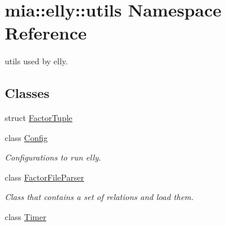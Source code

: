 \hypertarget{namespacemia_1_1elly_1_1utils}{\section{mia\-:\-:elly\-:\-:utils Namespace Reference}
\label{namespacemia_1_1elly_1_1utils}
}


utils used by elly.  


\subsection*{Classes}
\begin{DoxyCompactItemize}
\item 
struct \hyperlink{structmia_1_1elly_1_1utils_1_1_factor_tuple}{Factor\-Tuple}
\item 
class \hyperlink{classmia_1_1elly_1_1utils_1_1_config}{Config}
\begin{DoxyCompactList}\small\item\em Configurations to run elly. \end{DoxyCompactList}\item 
class \hyperlink{classmia_1_1elly_1_1utils_1_1_factor_file_parser}{Factor\-File\-Parser}
\begin{DoxyCompactList}\small\item\em Class that contains a set of relations and load them. \end{DoxyCompactList}\item 
class \hyperlink{classmia_1_1elly_1_1utils_1_1_timer}{Timer}
\end{DoxyCompactItemize}
